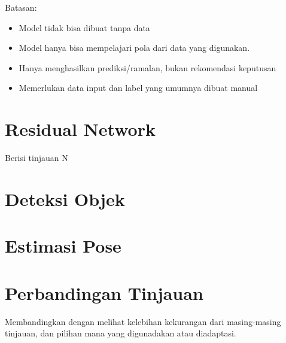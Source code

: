 Batasan:
\begin{itemize}
  \item Model tidak bisa dibuat tanpa data
  \item Model hanya bisa mempelajari pola dari data yang digunakan.
  \item Hanya menghasilkan prediksi/ramalan, bukan rekomendasi keputusan
  \item Memerlukan data input dan label yang umumnya dibuat manual
\end{itemize}

\section{Residual Network \label{sec:2-ResidualNetwork}}
Berisi tinjauan N

\section{Deteksi Objek\label{sec:2-DeteksiObjek}}

\section{Estimasi Pose\label{sec:2-EstimasiPose}}

\section{Perbandingan Tinjauan \label{sec2-Banding}}
Membandingkan dengan melihat kelebihan kekurangan dari masing-masing tinjauan, dan pilihan mana
yang digunadakan atau diadaptasi.
